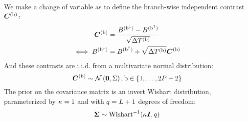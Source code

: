We make a change of variable as to define the branch-wise independent contrast $\bm{C}^{(\text{b})}$:
\begin{align}
    \contrast\branchexp &= \dfrac{\brownian^{(\nodeDown)} - \brownian^{(\nodeUp)}}{\sqrt{\branchtime\branchexp}} \\
    \label{eq:independent_contrast}
    \iff \brownian^{(\nodeDown)} &= \brownian^{(\nodeUp)} + \sqrt{\branchtime\branchexp}\contrast\branchexp
\end{align}
And these contrasts are i.i.d.
from a multivariate normal distribution:
\begin{equation}
    \label{eq:Distribcontrast}
    \contrast\branchexp \sim \mathcal{N}\left(\bm{0}, \Covariancematrix \right), \Setbranch
\end{equation}
The \gls{prior} on the covariance matrix is an invert Wishart distribution, parameterized by $\kappa=1$ and with $q=L + 1$ degrees of freedom:
\begin{equation}
    \label{eq:Distribcovariance}
    \CovarianceMatrix \sim \mathrm{Wishart}^{-1} (\covariancekappa \Identitymatrix, \covariancedf)
\end{equation}

